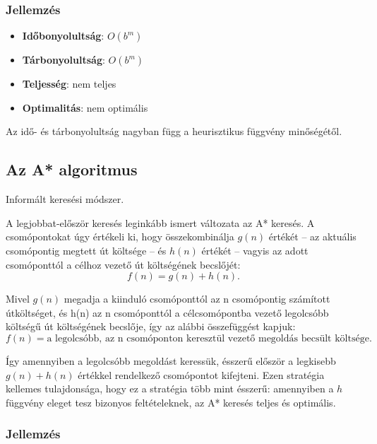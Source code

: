 \subsubsection{Jellemzés}

\begin{itemize}
    \item {\bf Időbonyolultság}: $O(b^m)$
    \item {\bf Tárbonyolultság}: $O(b^m)$
    \item {\bf Teljesség}: nem teljes
    \item {\bf Optimalitás}: nem optimális
\end{itemize}

\begin{megjegyzes}
    Az idő- és tárbonyolultság nagyban függ a heurisztikus függvény
    minőségétől.
\end{megjegyzes}

\subsection{Az A* algoritmus}

Informált keresési módszer.

A legjobbat-először keresés leginkább ismert változata az A* keresés. A
csomópontokat úgy értékeli ki, hogy összekombinálja $g(n)$ értékét – az aktuális
csomópontig megtett út költsége – és $h(n)$ értékét – vagyis az adott
csomóponttól a célhoz vezető út költségének becslőjét: \[
    f(n) = g(n) + h(n)
.\]

Mivel $g(n)$ megadja a kiinduló csomóponttól az n csomópontig számított
útköltséget, és h(n) az n csomóponttól a célcsomópontba vezető legolcsóbb
költségű út költségének becslője, így az alábbi összefüggést kapjuk:
\[
    f(n) = \text{a legolcsóbb, az n csomóponton keresztül vezető megoldás
    becsült költsége}
.\]

Így amennyiben a legolcsóbb megoldást keressük, ésszerű először a legkisebb
$g(n) + h(n)$ értékkel rendelkező csomópontot kifejteni. Ezen stratégia
kellemes tulajdonsága, hogy ez a stratégia több mint ésszerű: amennyiben a $h$
függvény eleget tesz bizonyos feltételeknek, az A* keresés teljes és optimális.

\subsubsection{Jellemzés}

